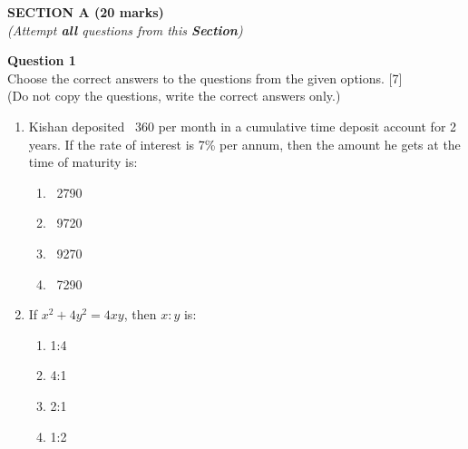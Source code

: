\begin{center}
   \large
   \textbf{SECTION A (20 marks)}\\
   \vspace{5mm}
   \normalsize
   \textit{(Attempt \textbf{all} questions from this \textbf{Section})}
\end{center}
\par
\noindent
\textbf{Question 1}\\
Choose the correct answers to the questions from the given options. \hfill [7]\\
(Do not copy the questions, write the correct answers only.)
\par
\vspace{2mm}
\begin{enumerate}[label=(\roman*)]

    \item Kishan deposited \rupee~360 per month in a cumulative time deposit 
        account for 2 years. If the rate of interest is 7\% per annum,
        then the amount he gets at the time of maturity is:

        \begin{multicols}{2}
        \begin{enumerate}[label=(\alph*)]
            \item \rupee~2790 
            \item \rupee~9720
            \item \rupee~9270
            \item \rupee~7290 
        \end{enumerate}
        \end{multicols}

    \newpage
    \item If $x^2 + 4y^2 = 4xy$, then $x:y$ is: 

        \begin{multicols}{2}
        \begin{enumerate}[label=(\alph*)]
            \item 1:4 
            \item 4:1 
            \item 2:1 
            \item 1:2 
        \end{enumerate}
        \end{multicols}


\end{enumerate}
